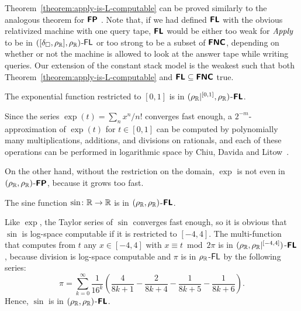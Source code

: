 \documentclass[envcountsect,envcountsame,orivec,oribibl]{llncs}
\begin{document}
Theorem~\ref{theorem:apply-is-L-computable} can be proved 
similarly to the analogous theorem for $\text{\bfseries \sffamily \upshape FP}$ 
\cite{kawamura11:_funct_space_repres_and_polyn_time_comput}. 
Note that, 
if we had defined $\text{\bfseries \sffamily \upshape FL}$ with the obvious relativized machine with one query tape,
$\text{\bfseries \sffamily \upshape FL}$ would be either too weak 
for $\mathit{Apply}$ to be in $([\delta _\square,\rho _\mathbb R], \rho _\mathbb R)$-$\mathsf{FL}$ or
too strong to be a subset of $\text{\bfseries \sffamily \upshape FNC}$,
depending on whether or not the machine is allowed to look at the answer tape while writing queries.
Our extension of the constant stack model is the weakest
such that both Theorem~\ref{theorem:apply-is-L-computable} and 
$\text{\bfseries \sffamily \upshape FL} \subseteq \text{\bfseries \sffamily \upshape FNC}$ true.


\begin{lemma}
 The exponential function restricted to $[0,1]$
 is in $(\rho _\mathbb R|^{[0,1]}, \rho _\mathbb R)$-$\text{\bfseries \sffamily \upshape FL}$.
\end{lemma}
Since the series $\exp(t) = \sum_n x^n / n!$ converges fast enough,
a $2^{-m}$-approximation of $\exp(t)$ for $t \in [0,1]$ can be computed
by polynomially many multiplications, additions, and divisions on rationals, 
and each of these operations can be performed in logarithmic space
by Chiu, Davida and Litow~\cite{chiu2001division}.

On the other hand, without the restriction on the domain, $\exp$ is not 
even in $(\rho _\mathbb R, \rho _\mathbb R)$-$\text{\bfseries \sffamily \upshape FP}$, 
because it grows too fast. 

\begin{lemma}
  The sine function $\sin \colon \mathbb R \to \mathbb R$ is
 in $(\rho _\mathbb R, \rho _\mathbb R)$-$\text{\bfseries \sffamily \upshape FL}$.
\end{lemma}
Like $\exp$, the Taylor series of $\sin$ converges fast enough,
so it is obvious that $\sin$ is log-space computable if it is restricted to $[-4, 4]$.
The multi-function that computes from $t$
any $x \in [-4, 4]$ with $x \equiv t \bmod 2 \pi$ is
in $(\rho _\mathbb R, \rho _\mathbb R|^{[-4,4]})$-$\text{\bfseries \sffamily \upshape FL}$, 
because division is log-space computable 
and $\pi$ is in $\rho _\mathbb R$-$\mathsf{FL}$ by the following series:
\begin{equation}
 \pi = \sum_{k=0}^\infty \frac{1}{16^k} 
  \left( \frac{4}{8k+1} - \frac{2}{8k+4} - \frac{1}{8k+5} - \frac{1}{8k+6} \right).
\end{equation}
Hence, $\sin$ is in $(\rho _\mathbb R, \rho _\mathbb R)$-$\text{\bfseries \sffamily \upshape FL}$.
\end{document}
